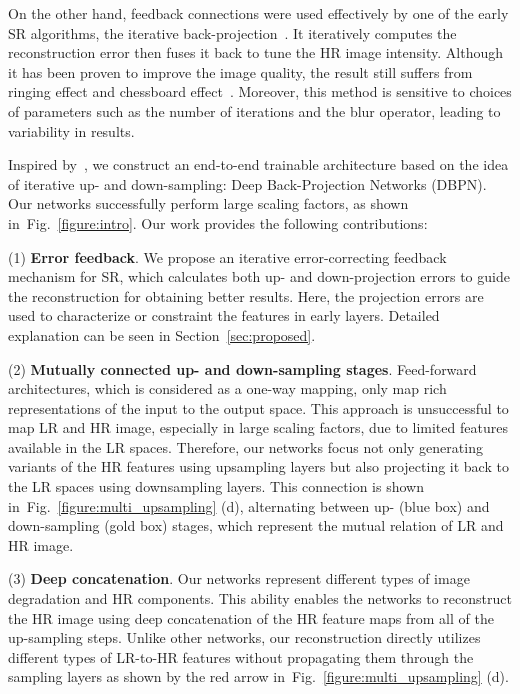 \documentclass[10pt,twocolumn,letterpaper]{article}
\begin{document}
On the other hand, feedback connections were used effectively by one
of the early SR algorithms, the iterative
back-projection~\cite{irani1991improving}. It iteratively computes the
reconstruction error then fuses it back to tune the HR image
intensity. Although it has been proven to improve the image quality,
the result still suffers from ringing effect and chessboard
effect~\cite{dai2007bilateral}. Moreover, this method is sensitive to
choices of parameters such as the number of iterations and the blur
operator, leading to variability in results.







Inspired by~\cite{irani1991improving}, we construct an end-to-end
trainable architecture based on the idea of iterative up- and
down-sampling: Deep Back-Projection Networks (DBPN). Our networks
successfully perform large scaling factors, as shown
in~Fig.~\ref{figure:intro}. Our work provides
the following contributions:


\noindent(1) \textbf{Error feedback}. We propose an iterative
error-correcting feedback mechanism for SR, which calculates both up- and down-projection errors to guide the reconstruction for obtaining better results. Here, the projection errors are used to characterize or constraint the features in early layers. Detailed explanation can be seen in Section~\ref{sec:proposed}.

\noindent(2) \textbf{Mutually connected up- and down-sampling stages}. 
Feed-forward architectures, which is considered as a one-way mapping, only map rich representations of the input to the output space. This approach is unsuccessful to map LR and HR image, especially in large scaling factors, due to limited features available in the LR spaces. Therefore, our networks focus not only generating variants of the HR features using upsampling layers but also projecting it back to the LR spaces using downsampling layers. This connection is shown in~Fig.~\ref{figure:multi_upsampling} (d), alternating between up- (blue box) and down-sampling (gold box) stages, which represent the mutual relation of LR and HR image.

\noindent(3) \textbf{Deep concatenation}. Our networks represent different types of image degradation and HR components. This ability enables the networks to reconstruct the HR image using deep concatenation of the HR feature maps from all of the up-sampling steps. Unlike other networks, our reconstruction directly utilizes different types of LR-to-HR features without propagating them through the sampling layers as shown by the red arrow in~Fig.~\ref{figure:multi_upsampling} (d).
\end{document}
